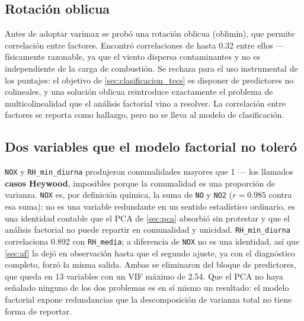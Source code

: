 \subsection{Rotación oblicua}

Antes de adoptar varimax se probó una rotación oblicua (oblimin), que permite
correlación entre factores. Encontró correlaciones de hasta 0.32 entre ellos
--- físicamente razonable, ya que el viento dispersa contaminantes y no es
independiente de la carga de combustión. Se rechaza para el uso instrumental
de los puntajes: el objetivo de \cref{sec:clasificacion_tecs} es disponer de
predictores no colineales, y una solución oblicua reintroduce exactamente el
problema de multicolinealidad que el análisis factorial vino a resolver. La
correlación entre factores se reporta como hallazgo, pero no se lleva al
modelo de clasificación.

\subsection{Dos variables que el modelo factorial no toleró}

\texttt{NOX} y \texttt{RH\_min\_diurna} produjeron comunalidades mayores que 1
--- los llamados \textbf{casos Heywood}, imposibles porque la comunalidad es
una proporción de varianza. \texttt{NOX} es, por definición química, la suma
de \texttt{NO} y \texttt{NO2} ($r=0.985$ contra esa suma): no es una variable
redundante en un sentido estadístico ordinario, es una identidad contable que
el PCA de \cref{sec:pca} absorbió sin protestar y que el análisis factorial no
puede repartir en comunalidad y unicidad. \texttt{RH\_min\_diurna}
correlaciona 0.892 con \texttt{RH\_media}; a diferencia de \texttt{NOX} no es
una identidad, así que \cref{sec:af} la dejó en observación hasta que el
segundo ajuste, ya con el diagnóstico completo, forzó la misma salida. Ambas
se eliminaron del bloque de predictores, que queda en 13 variables con un VIF
máximo de 2.54. Que el PCA no haya señalado ninguno de los dos problemas es en
sí mismo un resultado: el modelo factorial expone redundancias que la
descomposición de varianza total no tiene forma de reportar.
